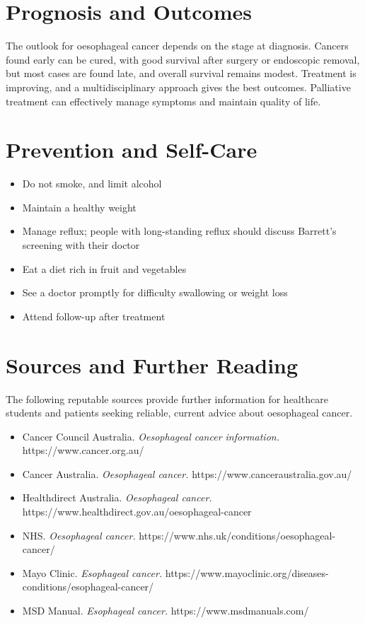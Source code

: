 \section*{Prognosis and Outcomes}
The outlook for oesophageal cancer depends on the stage at diagnosis. Cancers found early can be cured, with good survival after surgery or endoscopic removal, but most cases are found late, and overall survival remains modest. Treatment is improving, and a multidisciplinary approach gives the best outcomes. Palliative treatment can effectively manage symptoms and maintain quality of life.

\section*{Prevention and Self-Care}
\begin{itemize}
    \item Do not smoke, and limit alcohol
    \item Maintain a healthy weight
    \item Manage reflux; people with long-standing reflux should discuss Barrett's screening with their doctor
    \item Eat a diet rich in fruit and vegetables
    \item See a doctor promptly for difficulty swallowing or weight loss
    \item Attend follow-up after treatment
\end{itemize}

\section*{Sources and Further Reading}
The following reputable sources provide further information for healthcare students and patients seeking reliable, current advice about oesophageal cancer.
\begin{itemize}
    \item Cancer Council Australia. \textit{Oesophageal cancer information.} https://www.cancer.org.au/
    \item Cancer Australia. \textit{Oesophageal cancer.} https://www.canceraustralia.gov.au/
    \item Healthdirect Australia. \textit{Oesophageal cancer.} https://www.healthdirect.gov.au/oesophageal-cancer
    \item NHS. \textit{Oesophageal cancer.} https://www.nhs.uk/conditions/oesophageal-cancer/
    \item Mayo Clinic. \textit{Esophageal cancer.} https://www.mayoclinic.org/diseases-conditions/esophageal-cancer/
    \item MSD Manual. \textit{Esophageal cancer.} https://www.msdmanuals.com/
\end{itemize}
